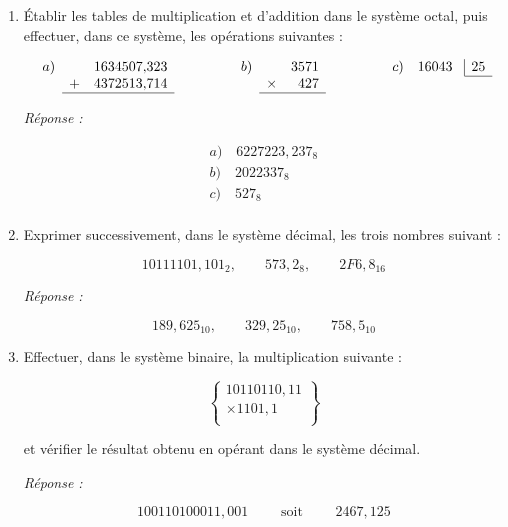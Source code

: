 \begin{enumerate} [label=\arabic*$^\circ$]
\item Établir les tables de multiplication et d'addition dans le système octal, puis effectuer, dans ce système, les opérations suivantes : 

\medskip

\[
\begin{array}{rcr@{\hspace*{0mm}}lc@{\hspace*{15mm}}rcrc@{\hspace*{15mm}}rc@{\hspace*{3mm}}|r}
a) & & 1634507,&323 && b) & & 3571&&c)  & 16043& 25 \\
\cline {12-12} 
  & + & 4372513,&714 && & \times & 427 &&\\
\cline {2-4} \cline{7-8}
\end{array}
\]

\medskip 

\textsl{Réponse : }

\[
\begin{array}{l} 
   a)\quad  6227223,237_8 \\
   b)\quad  2022337_8 \\
   c) \quad 527_8 \\      
\end{array}
\]

\newpage 

\item Exprimer successivement, dans le système décimal, les trois nombres suivant : 

\[   10111101,101_2, \qquad 573,2_8, \qquad 2F6,8_{16} \]


\textsl{Réponse : }


\[ 189,625_{10}, \qquad 329,25_{10}, \qquad 758,5_{10} \]


\item Effectuer, dans le système binaire, la multiplication suivante : 

\[ \left\lbrace \begin{array}{r} 
                  10110110,11 \\
                  \times 1101,1\\
                \end{array} 
   \right\rbrace
\]

et vérifier le résultat obtenu en opérant dans le système décimal.

\textsl{Réponse : }

\[ 100110100011,001 \qquad \text{ soit } \qquad 2467,125 \] 
                


\end{enumerate}
